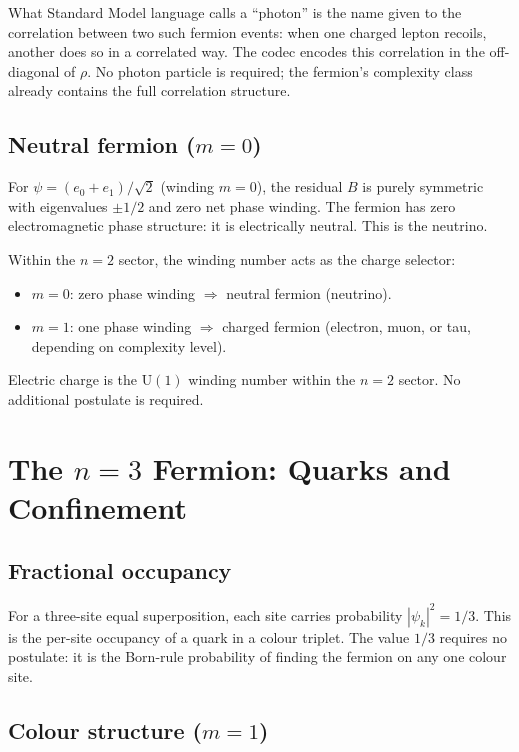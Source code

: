 \documentclass[11pt]{article}
\begin{document}
What Standard Model language calls a ``photon'' is the name given to
the correlation between two such fermion events: when one charged
lepton recoils, another does so in a correlated way.
The codec encodes this correlation in the off-diagonal of $\rho$.
No photon particle is required; the fermion's complexity class
already contains the full correlation structure.

\subsection{Neutral fermion ($m=0$)}

For $\psi = (e_0 + e_1)/\sqrt{2}$ (winding $m{=}0$), the
residual $B$ is purely symmetric with eigenvalues $\pm 1/2$ and
zero net phase winding.
The fermion has zero electromagnetic phase structure: it is
electrically neutral.
This is the neutrino.

Within the $n{=}2$ sector, the winding number acts as the charge
selector:
\begin{itemize}
  \item $m = 0$: zero phase winding $\Rightarrow$ neutral fermion
        (neutrino).
  \item $m = 1$: one phase winding $\Rightarrow$ charged fermion
        (electron, muon, or tau, depending on complexity level).
\end{itemize}
Electric charge is the $\mathrm{U}(1)$ winding number within the
$n{=}2$ sector.
No additional postulate is required.

\section{The $n{=}3$ Fermion: Quarks and Confinement}
\label{sec:n3}

\subsection{Fractional occupancy}

For a three-site equal superposition, each site carries probability
$|\psi_k|^2 = 1/3$.
This is the per-site occupancy of a quark in a colour triplet.
The value $1/3$ requires no postulate: it is the Born-rule
probability of finding the fermion on any one colour site.

\subsection{Colour structure ($m=1$)}
\end{document}
